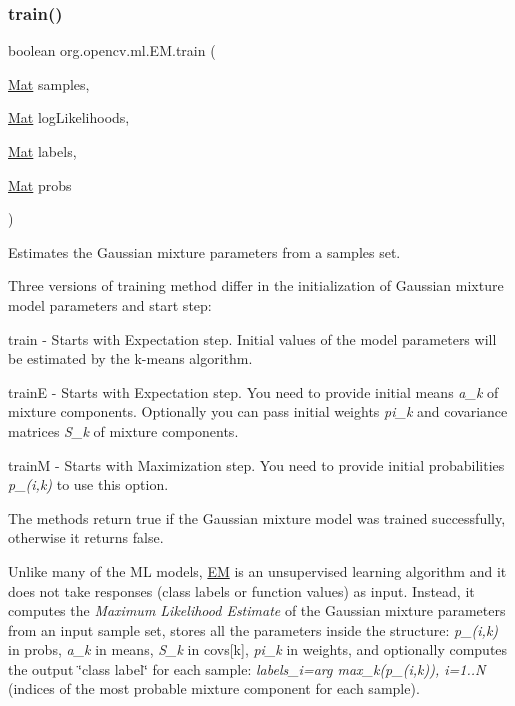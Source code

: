 \subsubsection{\texorpdfstring{train()}{train()}\hspace{0.1cm}{\footnotesize\ttfamily [1/2]}}
{\footnotesize\ttfamily boolean org.\+opencv.\+ml.\+E\+M.\+train (\begin{DoxyParamCaption}\item[{\mbox{\hyperlink{classorg_1_1opencv_1_1core_1_1_mat}{Mat}}}]{samples,  }\item[{\mbox{\hyperlink{classorg_1_1opencv_1_1core_1_1_mat}{Mat}}}]{log\+Likelihoods,  }\item[{\mbox{\hyperlink{classorg_1_1opencv_1_1core_1_1_mat}{Mat}}}]{labels,  }\item[{\mbox{\hyperlink{classorg_1_1opencv_1_1core_1_1_mat}{Mat}}}]{probs }\end{DoxyParamCaption})}

Estimates the Gaussian mixture parameters from a samples set.

Three versions of training method differ in the initialization of Gaussian mixture model parameters and start step\+:


\begin{DoxyItemize}
\item train -\/ Starts with Expectation step. Initial values of the model parameters will be estimated by the k-\/means algorithm. 
\item trainE -\/ Starts with Expectation step. You need to provide initial means {\itshape a\+\_\+k} of mixture components. Optionally you can pass initial weights {\itshape pi\+\_\+k} and covariance matrices {\itshape S\+\_\+k} of mixture components. 
\item trainM -\/ Starts with Maximization step. You need to provide initial probabilities {\itshape p\+\_\+(i,k)} to use this option. 
\end{DoxyItemize}

The methods return {\ttfamily true} if the Gaussian mixture model was trained successfully, otherwise it returns {\ttfamily false}.

Unlike many of the ML models, \mbox{\hyperlink{classorg_1_1opencv_1_1ml_1_1_e_m}{EM}} is an unsupervised learning algorithm and it does not take responses (class labels or function values) as input. Instead, it computes the {\itshape Maximum Likelihood Estimate} of the Gaussian mixture parameters from an input sample set, stores all the parameters inside the structure\+: {\itshape p\+\_\+(i,k)} in {\ttfamily probs}, {\itshape a\+\_\+k} in {\ttfamily means}, {\itshape S\+\_\+k} in {\ttfamily covs\mbox{[}k\mbox{]}}, {\itshape pi\+\_\+k} in {\ttfamily weights}, and optionally computes the output \char`\"{}class label\char`\"{} for each sample\+: {\itshape labels\+\_\+i=arg max\+\_\+k(p\+\_\+(i,k)), i=1..N} (indices of the most probable mixture component for each sample).

